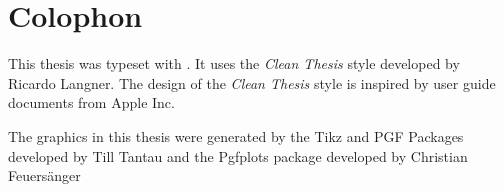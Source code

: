 \pagestyle{empty}
\hfill
\vfill
{}
\section*{Colophon}

This thesis was typeset with \LaTeXe.
It uses the \textit{Clean Thesis} style developed by Ricardo Langner.
The design of the \textit{Clean Thesis} style is inspired by user guide documents from Apple Inc.
\par
The graphics in this thesis were generated by the Tikz and PGF Packages developed by Till Tantau and the Pgfplots package developed by Christian Feuers{\"a}nger